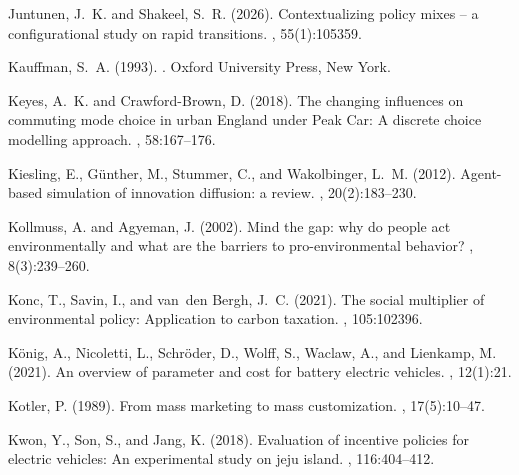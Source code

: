 \documentclass[12pt]{article}
\begin{document}
\begin{thebibliography}{}
Juntunen, J.~K. and Shakeel, S.~R. (2026).
\newblock Contextualizing policy mixes – a configurational study on rapid
  transitions.
, 55(1):105359.

Kauffman, S.~A. (1993).
.
\newblock Oxford University Press, New York.

Keyes, A.~K. and Crawford-Brown, D. (2018).
\newblock The changing influences on commuting mode choice in urban {England}
  under {Peak Car}: {A} discrete choice modelling approach.
, 58:167--176.

Kiesling, E., G{\"u}nther, M., Stummer, C., and Wakolbinger, L.~M. (2012).
\newblock Agent-based simulation of innovation diffusion: a review.
,
  20(2):183--230.

Kollmuss, A. and Agyeman, J. (2002).
\newblock Mind the gap: why do people act environmentally and what are the
  barriers to pro-environmental behavior?
, 8(3):239--260.

Konc, T., Savin, I., and van~den Bergh, J.~C. (2021).
\newblock The social multiplier of environmental policy: Application to carbon
  taxation.
, 105:102396.

K{\"o}nig, A., Nicoletti, L., Schr{\"o}der, D., Wolff, S., Waclaw, A., and
  Lienkamp, M. (2021).
\newblock An overview of parameter and cost for battery electric vehicles.
, 12(1):21.

Kotler, P. (1989).
\newblock From mass marketing to mass customization.
, 17(5):10--47.

Kwon, Y., Son, S., and Jang, K. (2018).
\newblock Evaluation of incentive policies for electric vehicles: An
  experimental study on jeju island.
,
  116:404--412.


\end{thebibliography}
\end{document}
